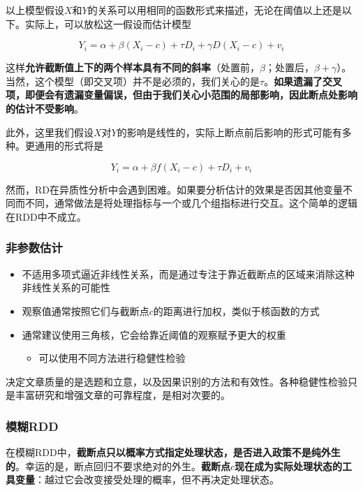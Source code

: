 \documentclass[11pt,a4paper]{ctexart}
\begin{document}
以上模型假设\(X\)和\(Y\)的关系可以用相同的函数形式来描述，无论在阈值以上还是以下。实际上，可以放松这一假设而估计模型

\[Y_i=\alpha+\beta(X_i-c)+\tau D_i+\gamma D(X_i-c)+v_i\]

这样\textbf{允许截断值上下的两个样本具有不同的斜率}（处置前，\(\beta\)；处置后，\(\beta+\gamma\)）。当然，这个模型（即交叉项）并不是必须的，我们关心的是\(\tau\)。\textbf{如果遗漏了交叉项，即便会有遗漏变量偏误，但由于我们关心小范围的局部影响，因此断点处影响的估计不受影响}。

此外，这里我们假设\(X\)对\(Y\)的影响是线性的，实际上断点前后影响的形式可能有多种。更通用的形式将是

\[Y_i=\alpha+\beta f(X_i-c)+\tau D_i+v_i\]

然而，RD在异质性分析中会遇到困难。如果要分析估计的效果是否因其他变量不同而不同，通常做法是将处理指标与一个或几个组指标进行交互。这个简单的逻辑在RDD中不成立。

\subsubsection{非参数估计}

\begin{itemize}
\item
  不适用多项式逼近非线性关系，而是通过专注于靠近截断点的区域来消除这种非线性关系的可能性
\item
  观察值通常按照它们与截断点\(c\)的距离进行加权，类似于核函数的方式
\item
  通常建议使用三角核，它会给靠近阈值的观察赋予更大的权重

  \begin{itemize}
  \item
    可以使用不同方法进行稳健性检验
  \end{itemize}
\end{itemize}

决定文章质量的是选题和立意，以及因果识别的方法和有效性。各种稳健性检验只是丰富研究和增强文章的可靠程度，是相对次要的。

\subsubsection{模糊RDD}

在模糊RDD中，\textbf{截断点只以概率方式指定处理状态，是否进入政策不是纯外生的}。幸运的是，断点回归不要求绝对的外生。\textbf{截断点\(c\)现在成为实际处理状态的工具变量}：越过它会改变接受处理的概率，但不再决定处理状态。
\end{document}

